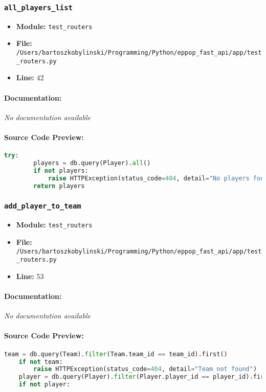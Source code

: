 \documentclass[11pt,a4paper]{article}
\begin{document}
\vspace{1em}
\subsubsection{\texttt{all\_players\_list}}

\begin{itemize}
    \item \textbf{Module:} \texttt{test\_routers}
    \item \textbf{File:} \texttt{/Users/bartoszkobylinski/Programming/Python/eppop\_fast\_api/app/test\_routers.py}
    \item \textbf{Line:} 42
\end{itemize}

\paragraph{Documentation:} \textit{No documentation available}

\paragraph{Source Code Preview:}
\begin{lstlisting}[language=Python]
    try:
        players = db.query(Player).all()
        if not players:
            raise HTTPException(status_code=404, detail="No players found")
        return players
\end{lstlisting}

\vspace{1em}
\subsubsection{\texttt{add\_player\_to\_team}}

\begin{itemize}
    \item \textbf{Module:} \texttt{test\_routers}
    \item \textbf{File:} \texttt{/Users/bartoszkobylinski/Programming/Python/eppop\_fast\_api/app/test\_routers.py}
    \item \textbf{Line:} 53
\end{itemize}

\paragraph{Documentation:} \textit{No documentation available}

\paragraph{Source Code Preview:}
\begin{lstlisting}[language=Python]
    team = db.query(Team).filter(Team.team_id == team_id).first()
    if not team:
        raise HTTPException(status_code=404, detail="Team not found")
    player = db.query(Player).filter(Player.player_id == player_id).first()
    if not player:
\end{lstlisting}
\end{document}
